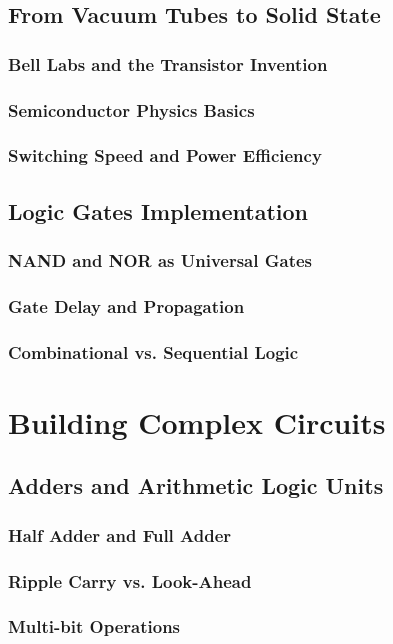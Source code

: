 \documentclass[12pt, oneside, openany]{book}
\begin{document}
\subsection{From Vacuum Tubes to Solid State}
\subsubsection{Bell Labs and the Transistor Invention}
\subsubsection{Semiconductor Physics Basics}
\subsubsection{Switching Speed and Power Efficiency}

\subsection{Logic Gates Implementation}
\subsubsection{NAND and NOR as Universal Gates}
\subsubsection{Gate Delay and Propagation}
\subsubsection{Combinational vs. Sequential Logic}

\section{Building Complex Circuits}
\subsection{Adders and Arithmetic Logic Units}
\subsubsection{Half Adder and Full Adder}
\subsubsection{Ripple Carry vs. Look-Ahead}
\subsubsection{Multi-bit Operations}
\end{document}
